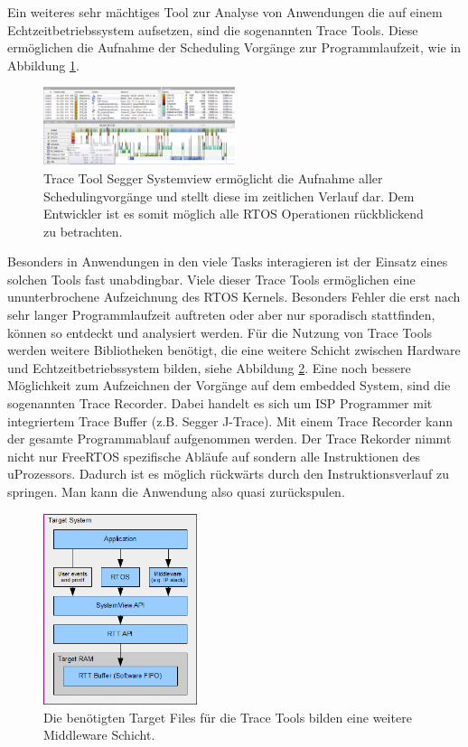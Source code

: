 Ein weiteres sehr mächtiges Tool zur Analyse von Anwendungen die auf einem Echtzeitbetriebssystem aufsetzen, sind die sogenannten Trace Tools. Diese ermöglichen die Aufnahme der Scheduling Vorgänge zur Programmlaufzeit, wie in Abbildung \ref {fig:Systemview}. 
\begin{figure}[!htb]
	\centering
		\includegraphics[width=0.5\textwidth]{Pictures/Segger/systemview.png}
	\caption{Trace Tool Segger Systemview ermöglicht die Aufnahme aller Schedulingvorgänge und stellt diese im zeitlichen Verlauf dar. Dem Entwickler ist es somit möglich alle RTOS Operationen rückblickend zu betrachten.}
	\label{fig:Systemview}
\end{figure}
Besonders in Anwendungen in den viele Tasks interagieren ist der Einsatz eines solchen Tools fast unabdingbar. Viele dieser Trace Tools ermöglichen eine ununterbrochene Aufzeichnung des RTOS Kernels. Besonders Fehler die erst nach sehr langer Programmlaufzeit auftreten oder aber nur sporadisch stattfinden, können so entdeckt und analysiert werden. Für die Nutzung von Trace Tools werden weitere Bibliotheken benötigt, die eine weitere Schicht zwischen Hardware und Echtzeitbetriebssystem bilden, siehe Abbildung \ref{fig:SystemviewTarget}. Eine noch bessere Möglichkeit zum Aufzeichnen der Vorgänge auf dem embedded System, sind die sogenannten Trace Recorder. Dabei handelt es sich um ISP Programmer mit integriertem Trace Buffer (z.B. Segger J-Trace). Mit einem Trace Recorder kann der gesamte Programmablauf aufgenommen werden. Der Trace Rekorder nimmt nicht nur FreeRTOS spezifische Abläufe auf sondern alle Instruktionen des uProzessors. Dadurch ist es möglich rückwärts durch den Instruktionsverlauf zu springen. Man kann die Anwendung also quasi zurückspulen.
\begin{figure}[htb]
	\centering
		\includegraphics[width=0.4\textwidth]{Pictures/Segger/SystemViewTarget.png}
	\caption{Die benötigten Target Files für die Trace Tools bilden eine weitere Middleware Schicht.}
	\label{fig:SystemviewTarget}
\end{figure}